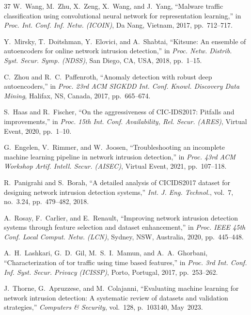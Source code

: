 \documentclass[conference]{IEEEtran}
\begin{document}
\begin{thebibliography}{37}
W.~Wang, M.~Zhu, X.~Zeng, X.~Wang, and J.~Yang, ``Malware traffic classification using convolutional neural network for representation learning,'' in \textit{Proc. Int. Conf. Inf. Netw. (ICOIN)}, Da Nang, Vietnam, 2017, pp.~712--717.

Y.~Mirsky, T.~Doitshman, Y.~Elovici, and A.~Shabtai, ``Kitsune: An ensemble of autoencoders for online network intrusion detection,'' in \textit{Proc. Netw. Distrib. Syst. Secur. Symp. (NDSS)}, San Diego, CA, USA, 2018, pp.~1--15.

C.~Zhou and R.~C.~Paffenroth, ``Anomaly detection with robust deep autoencoders,'' in \textit{Proc. 23rd ACM SIGKDD Int. Conf. Knowl. Discovery Data Mining}, Halifax, NS, Canada, 2017, pp.~665--674.

S.~Haas and R.~Fischer, ``On the aggressiveness of CIC-IDS2017: Pitfalls and improvements,'' in \textit{Proc. 15th Int. Conf. Availability, Rel. Secur. (ARES)}, Virtual Event, 2020, pp.~1--10.

G.~Engelen, V.~Rimmer, and W.~Joosen, ``Troubleshooting an incomplete machine learning pipeline in network intrusion detection,'' in \textit{Proc. 43rd ACM Workshop Artif. Intell. Secur. (AISEC)}, Virtual Event, 2021, pp.~107--118.

R.~Panigrahi and S.~Borah, ``A detailed analysis of CICIDS2017 dataset for designing network intrusion detection systems,'' \textit{Int. J. Eng. Technol.}, vol.~7, no.~3.24, pp.~479--482, 2018.

A.~Rosay, F.~Carlier, and E.~Renault, ``Improving network intrusion detection systems through feature selection and dataset enhancement,'' in \textit{Proc. IEEE 45th Conf. Local Comput. Netw. (LCN)}, Sydney, NSW, Australia, 2020, pp.~445--448.

A.~H.~Lashkari, G.~D.~Gil, M.~S.~I.~Mamun, and A.~A.~Ghorbani, ``Characterization of tor traffic using time based features,'' in \textit{Proc. 3rd Int. Conf. Inf. Syst. Secur. Privacy (ICISSP)}, Porto, Portugal, 2017, pp.~253--262.

J.~Thorne, G.~Apruzzese, and M.~Colajanni, ``Evaluating machine learning for network intrusion detection: A systematic review of datasets and validation strategies,'' \textit{Computers \& Security}, vol.~128, p.~103140, May~2023.


\end{thebibliography}
\end{document}

